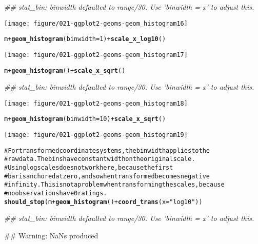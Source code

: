\documentclass[a4paper,titlepage]{tufte-handout}\usepackage{graphicx, color}
\makeatletter
\def\maxwidth{ %
  \ifdim\Gin@nat@width>\linewidth
    \linewidth
  \else
    \Gin@nat@width
  \fi
}
\newcommand{\hlfunctioncall}[1]{\textcolor[rgb]{0.501960784313725,0,0.329411764705882}{\textbf{#1}}}%
\newcommand{\hlstring}[1]{\textcolor[rgb]{0.6,0.6,1}{#1}}%
\newcommand{\hlcomment}[1]{\textcolor[rgb]{0.180392156862745,0.6,0.341176470588235}{#1}}%
\newenvironment{kframe}{%
 \def\at@end@of@kframe{}%
 \ifinner\ifhmode%
  \def\at@end@of@kframe{\end{minipage}}%
  \begin{minipage}{\columnwidth}%
 \fi\fi%
 \def\FrameCommand##1{\hskip\@totalleftmargin \hskip-\fboxsep
 \colorbox{shadecolor}{##1}\hskip-\fboxsep
     \hskip-\linewidth \hskip-\@totalleftmargin \hskip\columnwidth}%
 \MakeFramed {\advance\hsize-\width
   \@totalleftmargin\z@ \linewidth\hsize
   \@setminipage}}%
 {\par\unskip\endMakeFramed%
 \at@end@of@kframe}
\newenvironment{knitrout}{}{} %
\makeatother
\begin{document}
\begin{knitrout}
\begin{kframe}
{\ttfamily\noindent\itshape\textcolor{messagecolor}{\#\# stat\_bin: binwidth defaulted to range/30. Use 'binwidth = x' to adjust this.}}\end{kframe}\texttt{[image: figure/021-ggplot2-geoms-geom\_histogram16]} \begin{kframe}\begin{alltt}
m + \hlfunctioncall{geom_histogram}(binwidth = 1) + \hlfunctioncall{scale_x_log10}()
\end{alltt}
\end{kframe}\texttt{[image: figure/021-ggplot2-geoms-geom\_histogram17]} \begin{kframe}\begin{alltt}
m + \hlfunctioncall{geom_histogram}() + \hlfunctioncall{scale_x_sqrt}()
\end{alltt}


{\ttfamily\noindent\itshape\textcolor{messagecolor}{\#\# stat\_bin: binwidth defaulted to range/30. Use 'binwidth = x' to adjust this.}}\end{kframe}\texttt{[image: figure/021-ggplot2-geoms-geom\_histogram18]} \begin{kframe}\begin{alltt}
m + \hlfunctioncall{geom_histogram}(binwidth = 10) + \hlfunctioncall{scale_x_sqrt}()
\end{alltt}
\end{kframe}\texttt{[image: figure/021-ggplot2-geoms-geom\_histogram19]} \begin{kframe}\begin{alltt}
\hlcomment{# For transformed coordinate systems, the binwidth applies to the}
\hlcomment{# raw data.  The bins have constant width on the original scale.}
\hlcomment{# Using log scales does not work here, because the first}
\hlcomment{# bar is anchored at zero, and so when transformed becomes negative}
\hlcomment{# infinity.  This is not a problem when transforming the scales, because}
\hlcomment{# no observations have 0 ratings.}
\hlfunctioncall{should_stop}(m + \hlfunctioncall{geom_histogram}() + \hlfunctioncall{coord_trans}(x = \hlstring{"log10"}))
\end{alltt}


{\ttfamily\noindent\itshape\textcolor{messagecolor}{\#\# stat\_bin: binwidth defaulted to range/30. Use 'binwidth = x' to adjust this.}}

{\ttfamily\noindent\textcolor{warningcolor}{\#\# Warning: NaNs produced}}


\end{kframe}
\end{knitrout}
\end{document}

